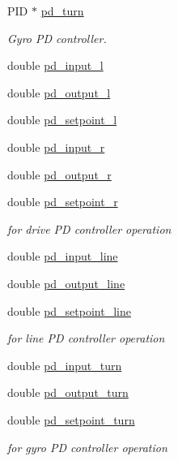 \begin{DoxyCompactItemize}
P\+ID $\ast$ \hyperlink{class_drive_train_a709deffb7683fd3efe0f340580a8e5e0}{pd\+\_\+turn}
\begin{DoxyCompactList}\small\item\em Gyro PD controller. \end{DoxyCompactList}\item 
double \hyperlink{class_drive_train_a5fbf7b883990fe8bf69f6a81c317438f}{pd\+\_\+input\+\_\+l}
\item 
double \hyperlink{class_drive_train_a53268d36c28c3ed0e70aaf69086d4953}{pd\+\_\+output\+\_\+l}
\item 
double \hyperlink{class_drive_train_a44be549ca050bf41e9b2474a2640200b}{pd\+\_\+setpoint\+\_\+l}
\item 
double \hyperlink{class_drive_train_a663ad534480bcd9ca2010a23dc506997}{pd\+\_\+input\+\_\+r}
\item 
double \hyperlink{class_drive_train_a4c3242a549d04b72192e5cf9e590845e}{pd\+\_\+output\+\_\+r}
\item 
double \hyperlink{class_drive_train_a57e389649151326bf84ab4bd13b6b61c}{pd\+\_\+setpoint\+\_\+r}
\begin{DoxyCompactList}\small\item\em for drive PD controller operation \end{DoxyCompactList}\item 
double \hyperlink{class_drive_train_a90fc51b379f9660ecef4f5a00275e63c}{pd\+\_\+input\+\_\+line}
\item 
double \hyperlink{class_drive_train_a02595614747de0602048d8d5e9643750}{pd\+\_\+output\+\_\+line}
\item 
double \hyperlink{class_drive_train_ad7872c04206945d3a2e04dcd167ea6a8}{pd\+\_\+setpoint\+\_\+line}
\begin{DoxyCompactList}\small\item\em for line PD controller operation \end{DoxyCompactList}\item 
double \hyperlink{class_drive_train_ad7822ae718d02c94e1baed9b3c13bb67}{pd\+\_\+input\+\_\+turn}
\item 
double \hyperlink{class_drive_train_a65aa0053b0648cf1fea8d0f0fc21c04e}{pd\+\_\+output\+\_\+turn}
\item 
double \hyperlink{class_drive_train_a2a1e6c6c70405144799a329bcfd0a969}{pd\+\_\+setpoint\+\_\+turn}
\begin{DoxyCompactList}\small\item\em for gyro PD controller operation \end{DoxyCompactList}\item 

\end{DoxyCompactItemize}
